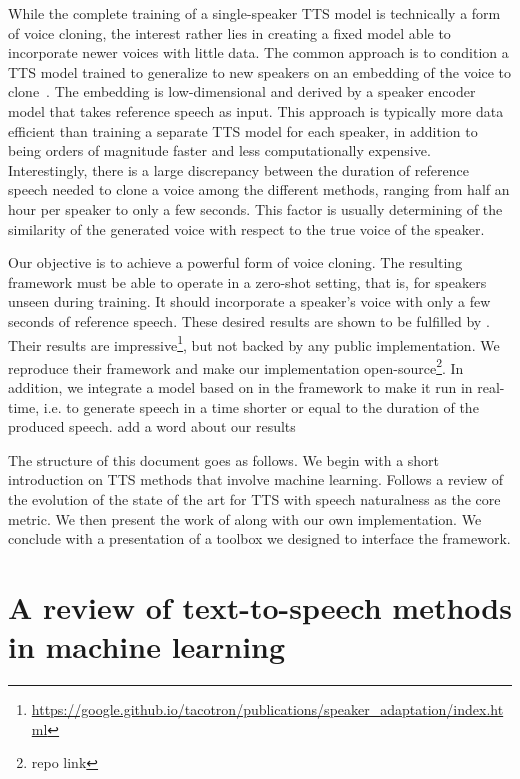 \documentclass[a4paper, oneside, 12pt, english]{article}
\begin{document}
While the complete training of a single-speaker TTS model is technically a form of voice cloning, the interest rather lies in creating a fixed model able to incorporate newer voices with little data. The common approach is to condition a TTS model trained to generalize to new speakers on an embedding of the voice to clone~\citep{DeepVoice2, CloningFewSamples, SV2TTS}. The embedding is low-dimensional and derived by a speaker encoder model that takes reference speech as input. This approach is typically more data efficient than training a separate TTS model for each speaker, in addition to being orders of magnitude faster and less computationally expensive. Interestingly, there is a large discrepancy between the duration of reference speech needed to clone a voice among the different methods, ranging from half an hour per speaker to only a few seconds. This factor is usually determining of the similarity of the generated voice with respect to the true voice of the speaker.

Our objective is to achieve a powerful form of voice cloning. The resulting framework must be able to operate in a zero-shot setting, that is, for speakers unseen during training. It should incorporate a speaker's voice with only a few seconds of reference speech. These desired results are shown to be fulfilled by \citep{SV2TTS}. Their results are impressive\footnote{\url{https://google.github.io/tacotron/publications/speaker_adaptation/index.html}}, but not backed by any public implementation. We reproduce their framework and make our implementation open-source\footnote{\color{red} repo link}. In addition, we integrate a model based on \citep{WaveRNN} in the framework to make it run in real-time, i.e. to generate speech in a time shorter or equal to the duration of the produced speech. \color{red} add a word about our results \color{black}

The structure of this document goes as follows. We begin with a short introduction on TTS methods that involve machine learning. Follows a review of the evolution of the state of the art for TTS with speech naturalness as the core metric. We then present the work of \citep{SV2TTS} along with our own implementation. We conclude with a presentation of a toolbox we designed to interface the framework.


\section{A review of text-to-speech methods in machine learning}
\end{document}
